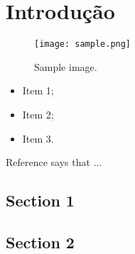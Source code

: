 \chapter{Introdução}
\label{cha:introducao}

\lipsum

\begin{figure}[htb]
	\centering
	\texttt{[image: sample.png]}
	\caption{Sample image.}
	\label{fig:sample-1}
\end{figure}



\begin{itemize}

	\item Item 1;

	\item Item 2;

	\item Item 3.


\end{itemize}

Reference  says that ...

\section{Section 1}

\lipsum
\cite{jensen1997petrinet}

\section{Section 2}

\lipsum

